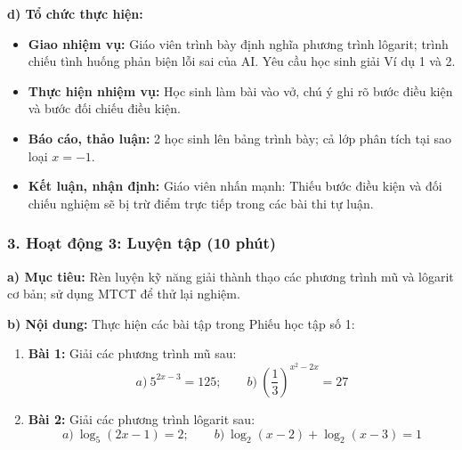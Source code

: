 \documentclass[12pt, a4paper]{article}
\begin{document}
\noindent \textbf{d) Tổ chức thực hiện:}
\begin{itemize}[leftmargin=0.6cm]
    \item \textbf{Giao nhiệm vụ:} Giáo viên trình bày định nghĩa phương trình lôgarit; trình chiếu tình huống phản biện lỗi sai của AI. Yêu cầu học sinh giải Ví dụ 1 và 2.
    \item \textbf{Thực hiện nhiệm vụ:} Học sinh làm bài vào vở, chú ý ghi rõ bước điều kiện và bước đối chiếu điều kiện.
    \item \textbf{Báo cáo, thảo luận:} 2 học sinh lên bảng trình bày; cả lớp phân tích tại sao loại $x = -1$.
    \item \textbf{Kết luận, nhận định:} Giáo viên nhấn mạnh: Thiếu bước điều kiện và đối chiếu nghiệm sẽ bị trừ điểm trực tiếp trong các bài thi tự luận.
\end{itemize}

\subsubsection*{3. Hoạt động 3: Luyện tập (10 phút)}

\noindent \textbf{a) Mục tiêu:}
Rèn luyện kỹ năng giải thành thạo các phương trình mũ và lôgarit cơ bản; sử dụng MTCT để thử lại nghiệm.

\noindent \textbf{b) Nội dung:}
Thực hiện các bài tập trong Phiếu học tập số 1:
\begin{enumerate}[leftmargin=0.6cm]
    \item \textbf{Bài 1:} Giải các phương trình mũ sau:
    $$a) \ 5^{2x - 3} = 125; \qquad b) \ \left(\dfrac{1}{3}\right)^{x^2 - 2x} = 27$$
    \item \textbf{Bài 2:} Giải các phương trình lôgarit sau:
    $$a) \ \log_5 (2x - 1) = 2; \qquad b) \ \log_2 (x - 2) + \log_2 (x - 3) = 1$$
\end{enumerate}
\end{document}
